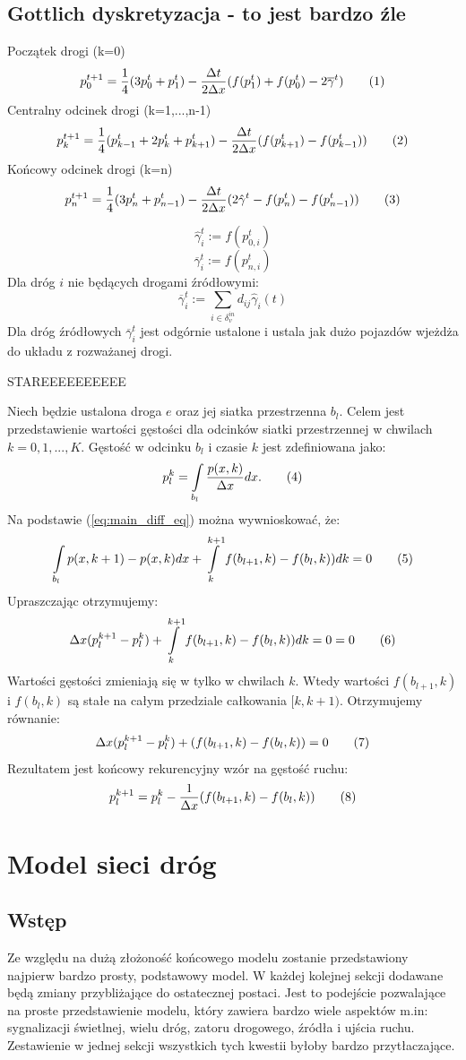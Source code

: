 \documentclass[12pt]{book}
\theoremstyle{plain}
\newcommand\addtag{\refstepcounter{equation}
\renewcommand{\labelenumii}{\theenumii}
\renewcommand{\theenumii}{\theenumi.\arabic{enumii}.}
\tag{\theequation}}
\begin{document}
\section{Gottlich dyskretyzacja - to jest bardzo źle}
Początek drogi (k=0)
\[p_0^{t+1}=\frac{1}{4}(3p_0^{t}+p_1^{t})  -\frac{\Delta t}{2 \Delta x}  (f(p_1^t)+f(p^t_0)-2\overline{\gamma}^t) \addtag \]
Centralny odcinek drogi (k=1,...,n-1)
\[p_k^{t+1}=\frac{1}{4}(p_{k-1}^{t}+2p_{k}^{t}+p_{k+1}^t)  -\frac{\Delta t}{2 \Delta x}  (f(p_{k+1}^t)-f(p_{k-1}^t)) \addtag \]
Końcowy odcinek drogi (k=n)
\[p_n^{t+1}=\frac{1}{4}(3p_n^{t}+p_{n-1}^{t})  -\frac{\Delta t}{2 \Delta x}  (2\hat{\gamma}^t -f(p_n^t)-f(p^t_{n-1})) \addtag \]

\[\hat{\gamma}^t_i:=f(p_{0,i}^t)\]
\[\overline{\gamma}^t_i:=f(p_{n,i}^t)\]
Dla dróg $i$ nie będących drogami źródłowymi:
\[\overline{\gamma}^t_i:=\sum_{i \in 
	\delta_{v}^{in}}d_{ij}\hat{\gamma}_{i}(t)\]
Dla dróg źródłowych $\overline{\gamma}^t_i $
jest odgórnie ustalone i ustala jak dużo pojazdów wjeżdża do układu z rozważanej drogi.

STAREEEEEEEEEE

Niech będzie ustalona droga $e$ oraz jej siatka przestrzenna $b_l$. Celem jest przedstawienie wartości gęstości dla odcinków siatki przestrzennej w chwilach $k=0,1,...,K$.
Gęstość w odcinku $b_l$ i czasie $k$ jest zdefiniowana jako:
\[p_{l}^{k}=\int\limits_{{b_{l}}}{\frac{p(x,k)}{\Delta x}dx}. \addtag\]
Na podstawie (\ref{eq:main_diff_eq}) można wywnioskować, że:
\[\int\limits_{b_{l}} {p(x,k+1)- p(x,k)dx} +\int\limits_{k}^{k+1} f(b_{l+1},k)-f(b_{l},k))dk=0 \addtag \label{eq:calki-LWR} \]
Upraszczając otrzymujemy:
\[\Delta x(p_l^{k+1}-p_l^{k}) +\int\limits_{k}^{k+1} f(b_{l+1},k)-f(b_{l},k))dk=0=0 \addtag \]
Wartości gęstości zmieniają się w tylko w chwilach $k$. Wtedy wartości $f(b_{l+1},k)$ i $f(b_l,k)$ są stałe na całym przedziale całkowania $[k,k+1)$. Otrzymujemy równanie:
\[\Delta x(p_l^{k+1}-p_l^{k})  + (f(b_{l+1},k)-f(b_l,k))=0 \addtag \]
Rezultatem jest końcowy rekurencyjny wzór na gęstość ruchu:
\[p_l^{k+1}=p_l^{k}  -\frac{1}{\Delta x}  (f(b_{l+1},k)-f(b_l,k)) \addtag \]







\chapter{Model sieci dróg} \label{chapter:model_sieci_drog}
\section{Wstęp}
Ze względu na dużą złożoność końcowego modelu zostanie przedstawiony najpierw bardzo prosty, podstawowy model. W każdej kolejnej sekcji dodawane będą zmiany przybliżające do ostatecznej postaci. Jest to podejście pozwalające na proste przedstawienie modelu, który zawiera bardzo wiele aspektów m.in:
sygnalizacji świetlnej, wielu dróg, zatoru drogowego, źródła i ujścia ruchu. Zestawienie w jednej sekcji wszystkich tych kwestii byłoby bardzo przytłaczające.
\end{document}
